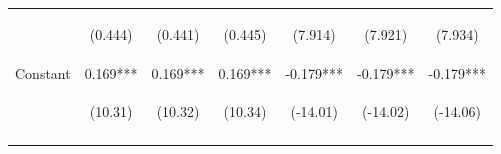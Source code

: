 \documentclass[]{article}
\begin{document}
\begin{center}
\begin{tabular}{lcccccc}
        \vspace{4pt}     & \begin{footnotesize}(0.444)\end{footnotesize}  & \begin{footnotesize}(0.441)\end{footnotesize}  & \begin{footnotesize}(0.445)\end{footnotesize}  & \begin{footnotesize}(7.914)\end{footnotesize}  & \begin{footnotesize}(7.921)\end{footnotesize}  & \begin{footnotesize}(7.934)\end{footnotesize}  \\
        Constant         & 0.169***                                       & 0.169***                                       & 0.169***                                       & -0.179***                                      & -0.179***                                      & -0.179***                                      \\
                         & \begin{footnotesize}(10.31)\end{footnotesize}  & \begin{footnotesize}(10.32)\end{footnotesize}  & \begin{footnotesize}(10.34)\end{footnotesize}  & \begin{footnotesize}(-14.01)\end{footnotesize} & \begin{footnotesize}(-14.02)\end{footnotesize} & \begin{footnotesize}(-14.06)\end{footnotesize} \\
        \vspace{4pt}     & \begin{footnotesize}\end{footnotesize}         & \begin{footnotesize}\end{footnotesize}         & \begin{footnotesize}\end{footnotesize}         & \begin{footnotesize}\end{footnotesize}         & \begin{footnotesize}\end{footnotesize}         & \begin{footnotesize}\end{footnotesize}         \\

\end{tabular}
\end{center}
\end{document}
